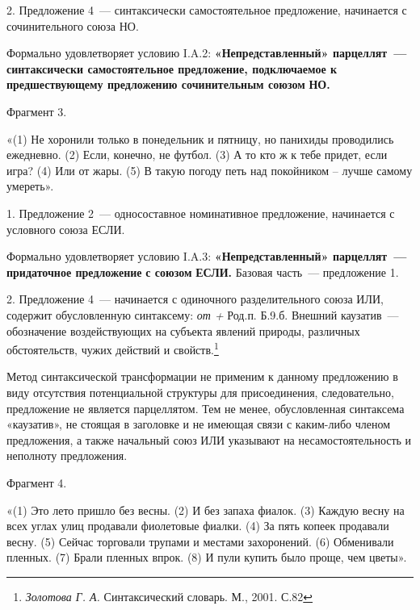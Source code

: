 \documentclass{kursa4}
\begin{document}
{      {2. Предложение 4~--- синтаксически
      самостоятельное предложение, начинается с сочинительного союза НО.}



      {Формально удовлетворяет условию I.A.2:
      }\textbf{{«Непредставленный»
      п}}\textbf{{арцеллят~--- синтаксически самостоятельное
      предложение, подключаемое к предшествующему предложению сочинительным
      союз}}\textbf{{ом}}\textbf{\textit{{
      }}}\textbf{{НО.}}


      \bigskip

      {Фрагмент 3.}

      {«(1) Не хоронили только в понедельник и пятницу, но
      панихиды проводились ежедневно. (2) Если, конечно, не футбол. (3) А то
      кто ж к тебе придет, если игра? (4) Или от жары. (5)
      }{В такую погоду петь над покойником –
      лучше самому умереть».}

      {1. Предложение 2~--- односоставное номинативное
      предложение, начинается с условного союза ЕСЛИ.}

      {Формально удовлетворяет условию I.A.3:
      }\textbf{{«Непредставленный» парцеллят~--- придаточное
      предложение }}\textbf{{с союзом
      }}\textbf{{ЕСЛИ}}\textbf{{.
      }}{Базовая часть~--- предложение 1. }

      {2. Предложение 4~--- начинается с одиночного
      разделительного союза ИЛИ, содержит обусловленную синтаксему:
      }\textit{{от + }}{Род.п. Б.9.б.
      Внешний каузатив~--- обозначение воздействующих на субъекта явлений
      природы, различных обстоятельств, чужих действий и
      свойств.}\footnote{\textit{{ Золотова Г. А.
      }}{Синтаксический словарь. М., 2001.
      С.82}}{ }

      {Метод синтаксической трансформации не применим к
      данному предложению в виду отсутствия потенциальной структуры для
      присоединения, следовательно, предложение не является парцеллятом. Тем
      не менее, обусловленная синтаксема «каузатив», не стоящая в заголовке и
      не имеющая связи с каким-либо членом предложения, а также начальный
      союз ИЛИ указывают на несамостоятельность и неполноту предложения. }

      {Фрагмент 4.}

      {«(1) Это лето пришло без весны. (2) И без запаха
      фиалок. (3) Каждую весну на всех углах улиц продавали фиолетовые
      фиалки. (4) За пять копеек продавали весну. (5) Сейчас торговали
      трупами и местами захоронений. (6) Обменивали
      }{пленных. (7) Брали пленных впрок. (8) И пули купить
      было проще, чем цветы».}

}
\end{document}
